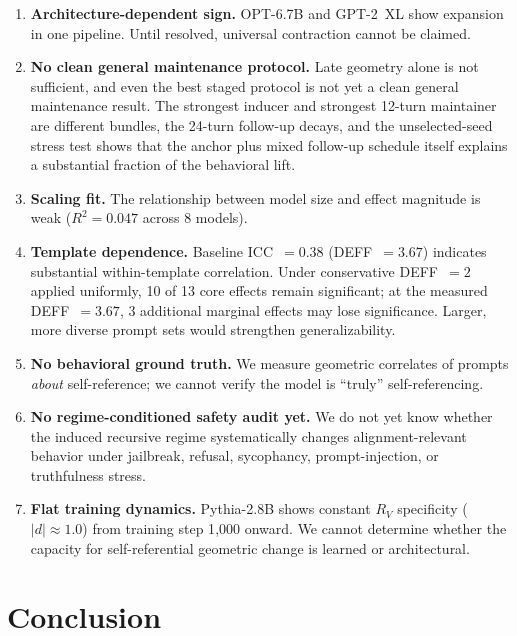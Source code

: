 \documentclass{article}
\newcommand{\RV}{R_V}
\newcommand{\dcohen}{d}
\begin{document}
\begin{enumerate}
\item \textbf{Architecture-dependent sign.}
      OPT-6.7B and GPT-2~XL show expansion in one pipeline. Until resolved, universal
      contraction cannot be claimed.
\item \textbf{No clean general maintenance protocol.}
      Late geometry alone is not sufficient, and even the best staged protocol is not yet a clean
      general maintenance result.
      The strongest inducer and strongest 12-turn maintainer are different bundles, the 24-turn
      follow-up decays, and the unselected-seed stress test shows that the anchor plus mixed
      follow-up schedule itself explains a substantial fraction of the behavioral lift.
\item \textbf{Scaling fit.}
      The relationship between model size and effect magnitude is weak
      ($R^2 = 0.047$ across 8 models).
\item \textbf{Template dependence.}
      Baseline ICC~$= 0.38$ (DEFF~$= 3.67$) indicates substantial within-template
      correlation.
      Under conservative DEFF~$= 2$ applied uniformly, 10 of 13 core effects remain
      significant; at the measured DEFF~$= 3.67$, 3 additional marginal effects
      may lose significance.
      Larger, more diverse prompt sets would strengthen generalizability.
\item \textbf{No behavioral ground truth.}
      We measure geometric correlates of prompts \emph{about} self-reference;
      we cannot verify the model is ``truly'' self-referencing.
\item \textbf{No regime-conditioned safety audit yet.}
      We do not yet know whether the induced recursive regime systematically changes
      alignment-relevant behavior under jailbreak, refusal, sycophancy, prompt-injection, or
      truthfulness stress.
\item \textbf{Flat training dynamics.}
      Pythia-2.8B shows constant $\RV$ specificity ($|\dcohen| \approx 1.0$) from training
      step 1{,}000 onward.
      We cannot determine whether the capacity for self-referential geometric change is
      learned or architectural.
\end{enumerate}


\section{Conclusion}
\end{document}
